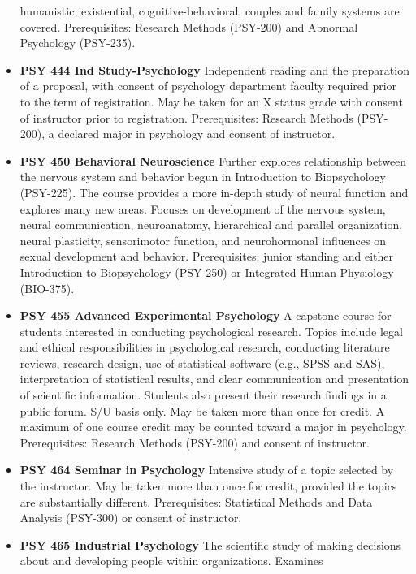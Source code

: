 \documentclass[
  letterpaper,
]{scrbook}
\begin{document}
\begin{itemize}
  humanistic, existential, cognitive-behavioral, couples and family
  systems are covered. Prerequisites: Research Methods (PSY-200) and
  Abnormal Psychology (PSY-235).
\item
  \textbf{PSY 444 Ind Study-Psychology} Independent reading and the
  preparation of a proposal, with consent of psychology department
  faculty required prior to the term of registration. May be taken for
  an X status grade with consent of instructor prior to registration.
  Prerequisites: Research Methods (PSY-200), a declared major in
  psychology and consent of instructor.\\
\item
  \textbf{PSY 450 Behavioral Neuroscience} Further explores relationship
  between the nervous system and behavior begun in Introduction to
  Biopsychology (PSY-225). The course provides a more in-depth study of
  neural function and explores many new areas. Focuses on development of
  the nervous system, neural communication, neuroanatomy, hierarchical
  and parallel organization, neural plasticity, sensorimotor function,
  and neurohormonal influences on sexual development and behavior.
  Prerequisites: junior standing and either Introduction to
  Biopsychology (PSY-250) or Integrated Human Physiology (BIO-375).
\item
  \textbf{PSY 455 Advanced Experimental Psychology} A capstone course
  for students interested in conducting psychological research. Topics
  include legal and ethical responsibilities in psychological research,
  conducting literature reviews, research design, use of statistical
  software (e.g., SPSS and SAS), interpretation of statistical results,
  and clear communication and presentation of scientific information.
  Students also present their research findings in a public forum. S/U
  basis only. May be taken more than once for credit. A maximum of one
  course credit may be counted toward a major in psychology.
  Prerequisites: Research Methods (PSY-200) and consent of instructor.
\item
  \textbf{PSY 464 Seminar in Psychology} Intensive study of a topic
  selected by the instructor. May be taken more than once for credit,
  provided the topics are substantially different. Prerequisites:
  Statistical Methods and Data Analysis (PSY-300) or consent of
  instructor.\\
\item
  \textbf{PSY 465 Industrial Psychology} The scientific study of making
  decisions about and developing people within organizations. Examines

\end{itemize}
\end{document}
